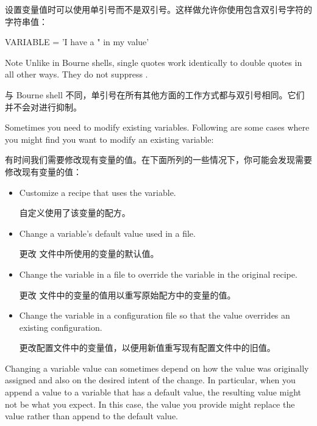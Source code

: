 设置变量值时可以使用单引号而不是双引号。这样做允许你使用包含双引号字符的字符串值：

\begin{pyglist}
VARIABLE = 'I have a " in my value'
\end{pyglist}

\begin{noteblock}{Note}%
Unlike in Bourne shells, single quotes work identically to double quotes in all other ways. They do not suppress .

\medskip
与 Bourne shell 不同，单引号在所有其他方面的工作方式都与双引号相同。它们并不会对进行抑制。
\end{noteblock}


Sometimes you need to modify existing variables. Following are some cases where you might find you want to modify an existing variable:

有时间我们需要修改现有变量的值。在下面所列的一些情况下，你可能会发现需要修改现有变量的值：

\begin{itemize}
\setlength\itemsep{1.0em}
\item Customize a recipe that uses the variable.

\medskip
自定义使用了该变量的配方。

\item Change a variable's default value used in a  file.

\medskip
更改  文件中所使用的变量的默认值。

\item Change the variable in a  file to override the variable in the original recipe.

\medskip
更改  文件中的变量的值用以重写原始配方中的变量的值。

\item Change the variable in a configuration file so that the value overrides an existing configuration.

\medskip
更改配置文件中的变量值，以便用新值重写现有配置文件中的旧值。
\end{itemize}

Changing a variable value can sometimes depend on how the value was originally assigned and also on the desired intent of the change. In particular, when you append a value to a variable that has a default value, the resulting value might not be what you expect. In this case, the value you provide might replace the value rather than append to the default value.

